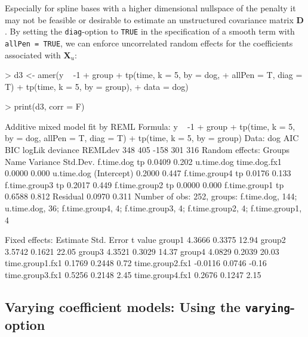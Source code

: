 \documentclass[12pt]{article}
\newenvironment{Schunk}{}{}
\newcommand{\code}[1]{\texttt{\small{#1}}}
\begin{document}
Especially for spline bases with a higher dimensional nullspace of the penalty it
may not be feasible or desirable to estimate an unstructured covariance matrix
$\bm D$. By setting the \code{diag}-option to \code{TRUE} in the specification of
a smooth term with \code{allPen = TRUE}, we can enforce uncorrelated random
effects for the coefficients associated with $\bm X_u$:
\begin{Schunk}
\begin{Sinput}
> d3 <- amer(y ~ -1 + group + tp(time, k = 5, by = dog, 
+     allPen = T, diag = T) + tp(time, k = 5, by = group), 
+     data = dog)
\end{Sinput}
\end{Schunk}
\begin{Schunk}
\begin{Sinput}
> print(d3, corr = F)
\end{Sinput}
\begin{Soutput}
Additive mixed model fit by REML 
Formula: y ~ -1 + group + tp(time, k = 5, by = dog, allPen = T, diag = T) +      tp(time, k = 5, by = group) 
   Data: dog 
 AIC BIC logLik deviance REMLdev
 348 405   -158      301     316
Random effects:
 Groups        Name         Variance Std.Dev.
 f.time.dog    tp           0.0409   0.202   
 u.time.dog    time.dog.fx1 0.0000   0.000   
 u.time.dog    (Intercept)  0.2000   0.447   
 f.time.group4 tp           0.0176   0.133   
 f.time.group3 tp           0.2017   0.449   
 f.time.group2 tp           0.0000   0.000   
 f.time.group1 tp           0.6588   0.812   
 Residual                   0.0970   0.311   
Number of obs: 252, groups: f.time.dog, 144; u.time.dog, 36; f.time.group4, 4; f.time.group3, 4; f.time.group2, 4; f.time.group1, 4

Fixed effects:
                Estimate Std. Error t value
group1            4.3666     0.3375   12.94
group2            3.5742     0.1621   22.05
group3            4.3521     0.3029   14.37
group4            4.0829     0.2039   20.03
time.group1.fx1   0.1769     0.2448    0.72
time.group2.fx1  -0.0116     0.0746   -0.16
time.group3.fx1   0.5256     0.2148    2.45
time.group4.fx1   0.2676     0.1247    2.15
\end{Soutput}
\end{Schunk}

\clearpage
\subsection{Varying coefficient models: Using the \texttt{varying}-option}
\end{document}
